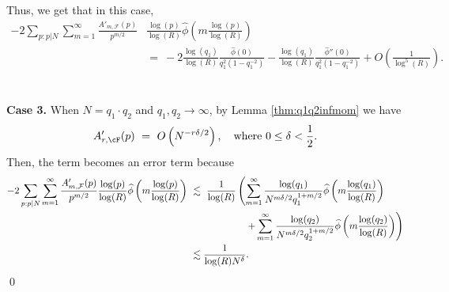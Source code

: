\documentclass[11pt, reqno]{amsart}
\theoremstyle{definition}
\theoremstyle{remark}
\numberwithin{equation}{section}
\renewcommand{\hat}{\widehat}
\begin{document}
Thus, we get that in this case, 
\begin{align}
    -2\sum_{p: p|N}\sum_{m=1}^{\infty}\frac{A'_{m, \mathcal{F}}(p)}{p^{m/2}}&\frac{\log(p)}{\log(R)}\hat{\phi}\left(m \frac{\log(p)}{\log(R)} \right)\nonumber\\ &=\ -2\frac{\log(q_1)}{\log(R)}\frac{\hat\phi(0)}{q_1^2(1-q_1^{-2})}- \frac{\log(q_1)}{\log(R)}\frac{\hat\phi''(0)}{q_1^2(1-q_1^{-2})} + O\left(\frac{1}{\log^5(R)}\right).
\end{align} \\ \ \\
\textbf{Case 3.} When $N = q_1\cdot q_2$ and $q_1,q_2 \to \infty$, by Lemma \ref{thm:q1q2infmom} we have
\[
A'_{r,\cF}(p) \ =\ O\left(N^{-r\delta/2} \right), \quad \text{where } 0 \leq \delta < \frac{1}{2}.
\] Then, the term becomes an error term because 
\begin{align*}
    -2\sum_{p: p|N}\sum_{m=1}^{\infty}\frac{A'_{m, \mathcal{F}}(p)}{p^{m/2}}\frac{\log(p)}{\log(R)}\hat{\phi}\left(m \frac{\log(p)}{\log(R)} \right) &\ \lesssim\ \frac{1}{\log(R)}\left(\sum_{m=1}^{\infty}\frac{\log(q_1)}{N^{m\delta/2}q_1^{1+m/2}}\hat{\phi}\left(m \frac{\log(q_1)}{\log(R)} \right) \right. \notag \\ & \qquad\qquad\qquad \left. +\sum_{m=1}^{\infty}\frac{\log(q_2)}{N^{m\delta/2}q_2^{1+m/2}}\hat{\phi}\left(m \frac{\log(q_2)}{\log(R)} \right) \right)\\
    &\ \lesssim \frac{1}{\log(R)N^{\delta}} .
\end{align*}
\qed
\vspace{1em}
\end{document}

